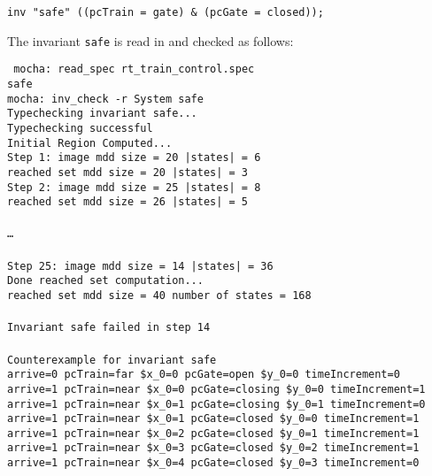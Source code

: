 \begin{center}
\tt inv "safe" \NOT((pcTrain = gate) \& \NOT(pcGate = closed));
\end{center}

\mypar
The invariant {\tt safe} is read in and checked as follows:

\mypar
{\tt
mocha: read\_spec rt\_train\_control.spec \\
safe \\
mocha: inv\_check -r System safe \\
Typechecking invariant safe... \\
Typechecking successful \\
Initial Region Computed... \\
Step 1: image mdd size =         20      |states| =        6    \\
reached set mdd size =         20        |states| =        3    \\
Step 2: image mdd size =         25      |states| =        8    \\
reached set mdd size =         26        |states| =        5    \\
\\
\ldots\\
\\
Step 25: image mdd size =         14     |states| =       36    \\
Done reached set computation... \\
reached set mdd size =         40        number of states =      168   \\
\\
Invariant safe failed in step 14  \\
\\
Counterexample for invariant safe \\
arrive=0 pcTrain=far  \$x\_0=0 pcGate=open    \$y\_0=0 timeIncrement=0  \\
arrive=1 pcTrain=near \$x\_0=0 pcGate=closing \$y\_0=0 timeIncrement=1  \\
arrive=1 pcTrain=near \$x\_0=1 pcGate=closing \$y\_0=1 timeIncrement=0  \\ 
arrive=1 pcTrain=near \$x\_0=1 pcGate=closed  \$y\_0=0 timeIncrement=1  \\ 
arrive=1 pcTrain=near \$x\_0=2 pcGate=closed  \$y\_0=1 timeIncrement=1  \\ 
arrive=1 pcTrain=near \$x\_0=3 pcGate=closed  \$y\_0=2 timeIncrement=1  \\ 
arrive=1 pcTrain=near \$x\_0=4 pcGate=closed  \$y\_0=3 timeIncrement=0  \\ 
}
